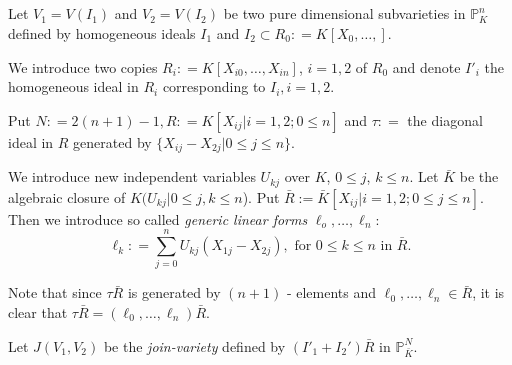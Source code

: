\setcounter{subsection}{1}
\subsection{}\label{chap2:sec2:subsec2.2}

Let $V_1 = V(I_1)$ and $V_2 = V(I_2)$ be two pure dimensional
subvarieties in $\mathbb{P}^n_K$ defined by homogeneous ideals $I_1$
and $I_2 \subset R_0:  = K[X_0, \ldots, ]$. 

We introduce two copies $R_i:  = K[X_{i0}, \ldots,  X_{in}]$, $i = 1,
2$ of $R_0$ and denote $I'_i$ the homogeneous ideal in $R_i$
corresponding to $I_i, i = 1, 2$. 

Put $N:  = 2(n+1)-1, R:  = K[X_{ij}| i=1, 2; 0 \le n]$ and $\tau:  =$
the diagonal ideal in $R$ generated by $\{ X_{ij}-X_{2j} | 0 \le j \le
n\}$.

We introduce new independent variables $U_{kj}$ over $K$, $0 \le j$,
$k \leq n$. 
Let $\bar{K}$ be the algebraic closure of $K(U_{kj} | 0 \le j, k \le
n$). Put $\bar{R} := \bar{K}[X_{ij}|i = 1, 2; 0 \le j \le n]$. Then we introduce
so called \textit{ generic linear forms} $\ell_o, \ldots,  \ell_n:$ 
$$
\ell_k:  = \sum^{n}_{j=0} U_{kj} (X_{1j}-X_{2j}), \text { for }  0 \le
k \le n \text{ in } \bar{R}. 
$$

Note that since $\tau \bar{R}$ is generated by $(n+1)$ - elements and
$\ell_0, \ldots,  \ell_n \in  \bar{R}$, it is clear that $\tau
\bar{R} = (\ell_0, \ldots,  \ell_n) \bar{R}$. 

Let $J(V_1, V_2)$ be the \textit{ join-variety } defined by
$(I'_1+I_2') \bar{R}$ in $\mathbb{P}^N_{\bar{K}}$. 

